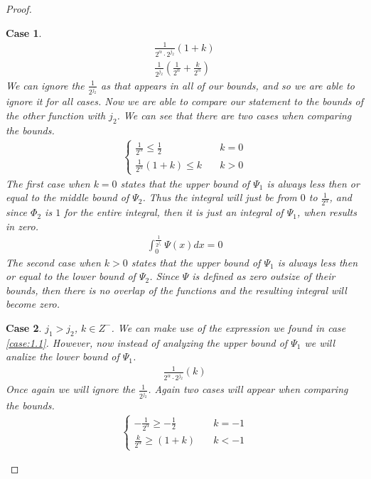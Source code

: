\documentclass[12pt]{amsart}
\newtheorem{case}{Case}
\begin{document}
\begin{proof}
\begin{case}
\begin{align}
     \frac{1}{2^\alpha\cdot2^{j_2}}(1+k)\\
     \frac{1}{2^{j_2}}\left(\frac{1}{2^\alpha}+\frac{k}{2^\alpha}\right)
    \end{align}
    We can ignore the $\frac{1}{2^{j_2}}$ as that appears in all of our
    bounds, and so we are able to ignore it for all cases. Now we are able to
    compare our statement to the bounds of the other function with $j_2$. We
    can see that there are two cases when comparing the bounds.
    \begin{align}
      \begin{cases}
        \frac{1}{2^\alpha} \leq \frac{1}{2} &\quad k =0\\
        \frac{1}{2^\alpha}(1+k) \leq k &\quad k >0
      \end{cases}
    \end{align} 
    The first case when $k=0$ states that the upper bound of $\Psi_1$ is
    always less then or equal to the middle bound of $\Psi_2$. Thus the
    integral will just be from $0$ to $\frac{1}{2^\alpha}$, and since $\Phi_2$
    is $1$ for the entire integral, then it is just an integral of $\Psi_1$,
    when results in zero.
    \begin{align}
     \int_{0}^{\frac{1}{2^{j_1}}}\Psi(x)dx = 0
    \end{align}
    The second case when $k>0$ states that the upper bound of $\Psi_1$ is
    always less then or equal to the lower bound of $\Psi_2$. Since $\Psi$ is
    defined as zero outsize of their bounds, then there is no overlap of the
    functions and the resulting integral will become zero.
  \end{case}
  \begin{case}\label{case:1.2}
    $j_1>j_2$, $k\in Z^-$. We can make use of the expression we found in
    case \ref{case:1.1}. However, now instead of analyzing the upper bound of
    $\Psi_1$ we will analize the lower bound of $\Psi_1$.
    \begin{align}
      \frac{1}{2^\alpha\cdot 2^{j_2}}(k)
    \end{align}
    Once again we will ignore the $\frac{1}{2^{j_2}}$. Again two cases will
    appear when comparing the bounds.
    \begin{align}
       \begin{cases}
         -\frac{1}{2^\alpha} \geq -\frac{1}{2} &\quad k=-1\\
         \frac{k}{2^\alpha} \geq (1+k) &\quad k<-1
       \end{cases}
    \end{align}

\end{case}
\end{proof}
\end{document}
